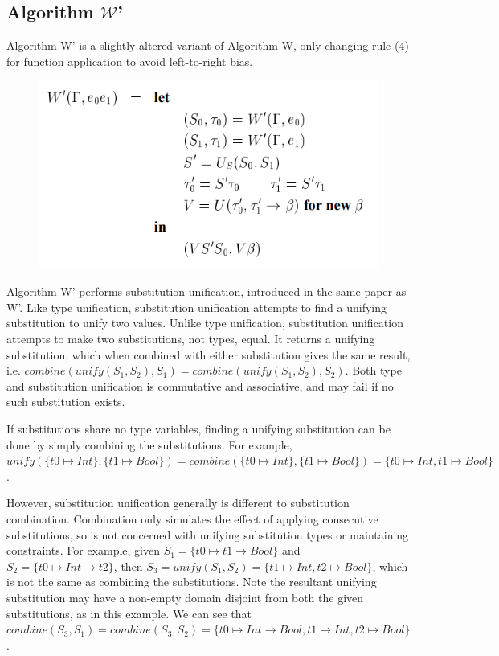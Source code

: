 \documentclass[a4paper,fleqn,oneside,12pt]{report}
\newcommand{\W}{$\mathcal{W}$}
\begin{document}
\subsection{Algorithm \texorpdfstring{\W}{W}'}

Algorithm W’ is a slightly altered variant of Algorithm W, only changing rule (4) for function application to avoid left-to-right bias.

\begin{figure}[h!]
  \centering
  \includegraphics[width=0.782\linewidth]{images/image22.png}
\end{figure}


Algorithm W’ performs substitution unification, introduced in the same paper as W’. Like type unification, substitution unification attempts to find a unifying substitution to unify two values. Unlike type unification, substitution unification attempts to make two substitutions, not types, equal. It returns a unifying substitution, which when combined with either substitution gives the same result, i.e. $combine(unify(S_1, S_2), S_1) = combine(unify(S_1, S_2), S_2)$. Both type and substitution unification is commutative and associative, and may fail if no such substitution exists.

If substitutions share no type variables, finding a unifying substitution can be done by simply combining the substitutions. For example, $unify(\{ t0 \mapsto Int \}, \{ t1 \mapsto Bool \}) = combine(\{ t0 \mapsto Int \}, \{ t1 \mapsto Bool \}) = \{ t0 \mapsto Int, t1 \mapsto Bool \}$.

However, substitution unification generally is different to substitution combination. Combination only simulates the effect of applying consecutive substitutions, so is not concerned with unifying substitution types or maintaining constraints. For example, given $S_1 = \{ t0 \mapsto t1 \rightarrow Bool \}$ and $S_2 = \{ t0 \mapsto Int \rightarrow t2 \}$, then $S_3 = unify(S_1, S_2) = \{ t1 \mapsto Int, t2 \mapsto Bool \}$, which is not the same as combining the substitutions. Note the resultant unifying substitution may have a non-empty domain disjoint from both the given substitutions, as in this example. We can see that $combine(S_3, S_1) = combine(S_3, S_2) = \{ t0 \mapsto Int \rightarrow Bool, t1 \mapsto Int, t2 \mapsto Bool \}$.
\end{document}
